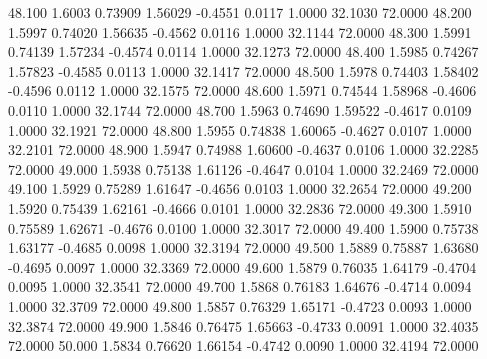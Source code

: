   48.100   1.6003   0.73909   1.56029  -0.4551   0.0117   1.0000  32.1030  72.0000
  48.200   1.5997   0.74020   1.56635  -0.4562   0.0116   1.0000  32.1144  72.0000
  48.300   1.5991   0.74139   1.57234  -0.4574   0.0114   1.0000  32.1273  72.0000
  48.400   1.5985   0.74267   1.57823  -0.4585   0.0113   1.0000  32.1417  72.0000
  48.500   1.5978   0.74403   1.58402  -0.4596   0.0112   1.0000  32.1575  72.0000
  48.600   1.5971   0.74544   1.58968  -0.4606   0.0110   1.0000  32.1744  72.0000
  48.700   1.5963   0.74690   1.59522  -0.4617   0.0109   1.0000  32.1921  72.0000
  48.800   1.5955   0.74838   1.60065  -0.4627   0.0107   1.0000  32.2101  72.0000
  48.900   1.5947   0.74988   1.60600  -0.4637   0.0106   1.0000  32.2285  72.0000
  49.000   1.5938   0.75138   1.61126  -0.4647   0.0104   1.0000  32.2469  72.0000
  49.100   1.5929   0.75289   1.61647  -0.4656   0.0103   1.0000  32.2654  72.0000
  49.200   1.5920   0.75439   1.62161  -0.4666   0.0101   1.0000  32.2836  72.0000
  49.300   1.5910   0.75589   1.62671  -0.4676   0.0100   1.0000  32.3017  72.0000
  49.400   1.5900   0.75738   1.63177  -0.4685   0.0098   1.0000  32.3194  72.0000
  49.500   1.5889   0.75887   1.63680  -0.4695   0.0097   1.0000  32.3369  72.0000
  49.600   1.5879   0.76035   1.64179  -0.4704   0.0095   1.0000  32.3541  72.0000
  49.700   1.5868   0.76183   1.64676  -0.4714   0.0094   1.0000  32.3709  72.0000
  49.800   1.5857   0.76329   1.65171  -0.4723   0.0093   1.0000  32.3874  72.0000
  49.900   1.5846   0.76475   1.65663  -0.4733   0.0091   1.0000  32.4035  72.0000
  50.000   1.5834   0.76620   1.66154  -0.4742   0.0090   1.0000  32.4194  72.0000
